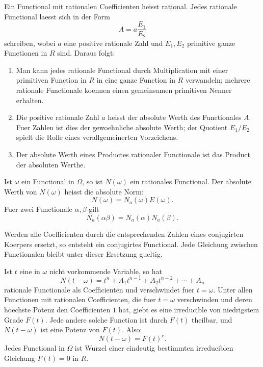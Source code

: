\documentclass[11pt]{article}
\begin{document}
Ein Functional mit rationalen Coefficienten heisst rational. Jedes
rationale Functional laesst sich in der Form
\[
A=a\frac{E_1}{E_2}
\]
schreiben, wobei \(a\) eine positive rationale Zahl und \(E_1,E_2\)
primitive ganze Functionen in \(R\) sind. Daraus folgt:
\begin{enumerate}[label=\arabic*.]
\item Man kann jedes rationale Functional durch Multiplication mit
einer primitiven Function in \(R\) in eine ganze Function in \(R\)
verwandeln; mehrere rationale Functionale koennen einen gemeinsamen
primitiven Nenner erhalten.

\item Die positive rationale Zahl \(a\) heisst der absolute Werth des
Functionales \(A\). Fuer Zahlen ist dies der gewoehnliche absolute
Werth; der Quotient \(E_1/E_2\) spielt die Rolle eines verallgemeinerten
Vorzeichens.

\item Der absolute Werth eines Productes rationaler Functionale ist
das Product der absoluten Werthe.
\end{enumerate}

Ist \(\omega\) ein Functional in \(\Omega\), so ist \(N(\omega)\) ein
rationales Functional. Der absolute Werth von \(N(\omega)\) heisst
die absolute Norm:
\begin{equation}
N(\omega)=N_a(\omega)E(\omega).
\tag{3}
\end{equation}
Fuer zwei Functionale \(\alpha,\beta\) gilt
\begin{equation}
N_a(\alpha\beta)=N_a(\alpha)N_a(\beta).
\tag{4}
\end{equation}

Werden alle Coefficienten durch die entsprechenden Zahlen eines
conjugirten Koerpers ersetzt, so entsteht ein conjugirtes Functional.
Jede Gleichung zwischen Functionalen bleibt unter dieser Ersetzung
gueltig.

Ist \(t\) eine in \(\omega\) nicht vorkommende Variable, so hat
\[
N(t-\omega)=t^n+A_1t^{n-1}+A_2t^{n-2}+\cdots+A_n
\tag{5}
\]
rationale Functionale als Coefficienten und verschwindet fuer
\(t=\omega\). Unter allen Functionen mit rationalen Coefficienten, die
fuer \(t=\omega\) verschwinden und deren hoechste Potenz den
Coefficienten \(1\) hat, giebt es eine irreducible von niedrigstem
Grade \(F(t)\). Jede andere solche Function ist durch \(F(t)\)
theilbar, und \(N(t-\omega)\) ist eine Potenz von \(F(t)\). Also:
\[
N(t-\omega)=F(t)^e.
\]
Jedes Functional in \(\Omega\) ist Wurzel einer eindeutig bestimmten
irreduciblen Gleichung \(F(t)=0\) in \(R\).
\end{document}

